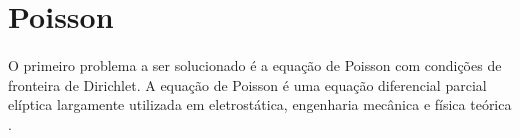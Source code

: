 \documentclass[poisson.tex]{subfiles}
\begin{document}
\section{Poisson}
\paragraph{} O primeiro problema a ser solucionado é a equação de Poisson com condições de fronteira de Dirichlet. A equação de Poisson é uma equação diferencial parcial elíptica largamente utilizada em eletrostática, engenharia mecânica e física teórica \cite{poissonWiki}.
\end{document}
